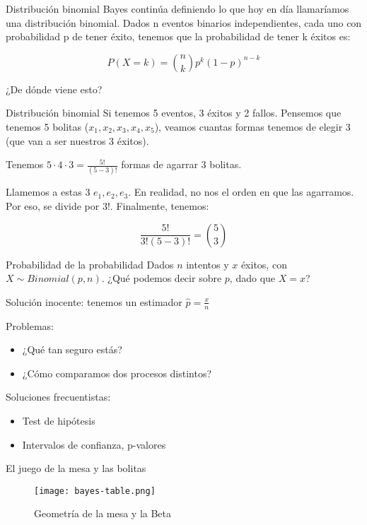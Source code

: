 \documentclass{beamer}
\begin{document}
\begin{frame}{Distribución binomial}
	Bayes continúa definiendo lo que hoy en día llamaríamos una distribución binomial. Dados n eventos binarios independientes, cada uno con probabilidad p de tener éxito, tenemos que la probabilidad de tener k éxitos es:
	
	$$P(X=k) = \binom{n}{k} p^k (1-p)^{n-k}$$
	
	¿De dónde viene esto?
\end{frame}

\begin{frame}{Distribución binomial}
	Si tenemos 5 eventos, 3 éxitos y 2 fallos. Pensemos que tenemos 5 bolitas ($x_1, x_2, x_3, x_4, x_5$), veamos cuantas formas tenemos de elegir 3 (que van a ser nuestros 3 éxitos).\pause
	
	Tenemos $5 \cdot 4 \cdot 3 = \frac{5!}{(5-3)!}$ formas de agarrar 3 bolitas.\pause

	Llamemos a estas 3 $e_1, e_2, e_3$. En realidad, no nos el orden en que las agarramos. Por eso, se divide por $3!$. Finalmente, tenemos:

	$$\frac{5!}{3!(5-3)!} = \binom{5}{3}$$
\end{frame}

\begin{frame}{Probabilidad de la probabilidad}
	Dados $n$ intentos y $x$ éxitos, con $X \sim Binomial(p, n)$.
	¿Qué podemos decir sobre $p$, dado que $X = x$?\pause

	Solución inocente: tenemos un estimador $\hat{p} = \frac{x}{n}$\pause

	Problemas:
	\begin{itemize}
		\item ¿Qué tan seguro estás?
		\item ¿Cómo comparamos dos procesos distintos?
	\end{itemize}

	Soluciones frecuentistas:
	\begin{itemize}
		\item Test de hipótesis
		\item Intervalos de confianza, p-valores
	\end{itemize}
\end{frame}

\begin{frame}{El juego de la mesa y las bolitas}
	\begin{figure}
		\centering
		\texttt{[image: bayes-table.png]}
		\caption{Geometría de la mesa y la Beta}
		\label{fig:bayes-table}
	\end{figure}
\end{frame}
\end{document}
